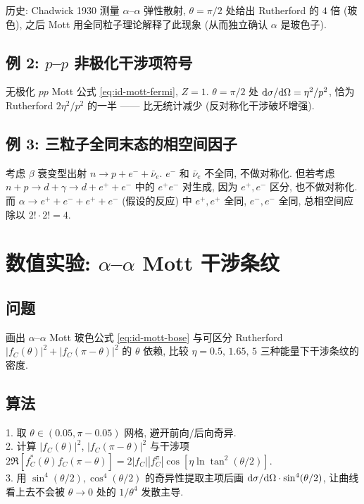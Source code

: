 历史: Chadwick 1930 测量 $\alpha$--$\alpha$ 弹性散射, $\theta=\pi/2$ 处给出 Rutherford 的 $4$ 倍 (玻色), 之后 Mott 用全同粒子理论解释了此现象 (从而独立确认 $\alpha$ 是玻色子).

\subsection{例 2: $p$--$p$ 非极化干涉项符号}\label{sec:id-ex-pp}

无极化 $pp$ Mott 公式 \eqref{eq:id-mott-fermi}, $Z=1$. $\theta=\pi/2$ 处 $\mathrm{d}\sigma/\mathrm{d}\Omega=\eta^2/p^2$, 恰为 Rutherford $2\eta^2/p^2$ 的一半 —— 比无统计减少 (反对称化干涉破坏增强).

\subsection{例 3: 三粒子全同末态的相空间因子}\label{sec:id-ex-3body}

考虑 $\beta$ 衰变型出射 $n\to p+e^-+\bar\nu_e$. $e^-$ 和 $\bar\nu_e$ 不全同, 不做对称化. 但若考虑 $n+p\to d+\gamma\to d+e^++e^-$ 中的 $e^+e^-$ 对生成, 因为 $e^+,e^-$ 区分, 也不做对称化. 而 $\alpha\to e^++e^-+e^++e^-$ (假设的反应) 中 $e^+,e^+$ 全同, $e^-,e^-$ 全同, 总相空间应除以 $2!\cdot 2!=4$.

\section{数值实验: $\alpha$--$\alpha$ Mott 干涉条纹}\label{sec:numexp-ch-id}

\subsection*{问题}
画出 $\alpha$--$\alpha$ Mott 玻色公式 \eqref{eq:id-mott-bose} 与可区分 Rutherford $|f_C(\theta)|^2+|f_C(\pi-\theta)|^2$ 的 $\theta$ 依赖, 比较 $\eta=0.5,\,1.65,\,5$ 三种能量下干涉条纹的密度.

\subsection*{算法}
1. 取 $\theta\in(0.05,\pi-0.05)$ 网格, 避开前向/后向奇异.\\
2. 计算 $|f_C(\theta)|^2$, $|f_C(\pi-\theta)|^2$ 与干涉项 $2\Re[f_C^*(\theta)f_C(\pi-\theta)]=2|f_C||f_C^{\pi}|\cos[\eta\ln\tan^2(\theta/2)]$.\\
3. 用 $\sin^4(\theta/2),\cos^4(\theta/2)$ 的奇异性提取主项后画 $\mathrm{d}\sigma/\mathrm{d}\Omega\cdot\sin^4(\theta/2)$, 让曲线看上去不会被 $\theta\to 0$ 处的 $1/\theta^4$ 发散主导.

